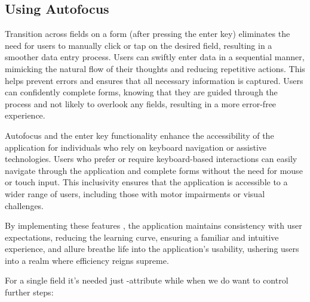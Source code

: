 
\subsection{Using Autofocus}

Transition across fields on a form (after pressing the enter key) eliminates the need for users to manually 
click or tap on the desired field, resulting in a smoother data entry process. Users can swiftly enter data in a 
sequential manner, mimicking the natural flow of their thoughts and reducing repetitive actions. This helps prevent 
errors and ensures that all necessary information is captured. Users can confidently complete forms, knowing that 
they are guided through the process and not likely to overlook any fields, resulting in a more error-free experience.

Autofocus and the enter key functionality enhance the accessibility of the application for individuals who rely on 
keyboard navigation or assistive technologies. Users who prefer or require keyboard-based interactions can easily 
navigate through the application and complete forms without the need for mouse or touch input. This inclusivity ensures 
that the application is accessible to a wider range of users, including those with motor impairments or visual 
challenges.

By implementing these features , the application maintains consistency with user expectations, reducing 
the learning curve, ensuring a familiar and intuitive experience, and allure breathe life into the application's 
usability, ushering users into a realm where efficiency reigns supreme.

For a single field it's needed just -attribute while when we do want to control further steps:

